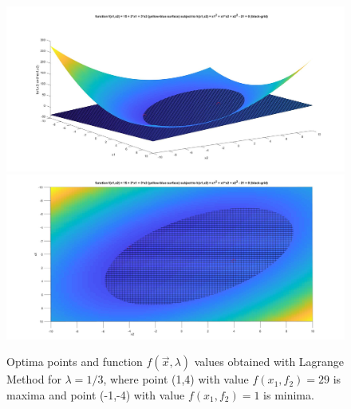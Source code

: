 \documentclass[main.tex]{subfiles}
\begin{document}
\begin{figure}[H]
\label{fig:lagrangeEquationFigs}
\centering
\includegraphics[width=\textwidth]{LagrangeMultiplerMethod/LagrangeMethod_solved.jpg}
\includegraphics[width=\textwidth]{LagrangeMultiplerMethod/LagrangeMethod_solved_view(0,90).jpg}
\caption{Optima points and function $f(\vec{x},\lambda)$ values obtained with Lagrange Method for $\lambda=1/3$, where point (1,4) with value $f(x_1,f_2)=29$ is maxima and point (-1,-4) with value $f(x_1,f_2)=1$ is minima.}
\end{figure}
\end{document}
